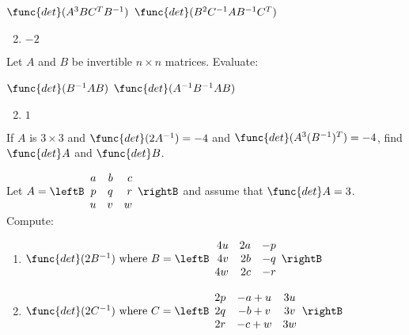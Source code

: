 \begin{multicols}{2}
\begin{ex}
\begin{exenumerate}
\exitem $\func{det}(A^{3}BC^{T}B^{-1})$
\exitem $\func{det}(B^{2}C^{-1}AB^{-1}C^{T})$
\end{exenumerate}
\begin{sol}
\begin{enumerate}[label={\alph*.}]
\setcounter{enumi}{1}
\item  $-2$

\end{enumerate}
\end{sol}
\end{ex}

\begin{ex}
Let $A$ and $B$ be invertible $n \times n$ matrices. Evaluate:

\begin{exenumerate}
\exitem $\func{det}(B^{-1}AB)$
\exitem $\func{det}(A^{-1}B^{-1}AB)$
\end{exenumerate}
\begin{sol}
\begin{enumerate}[label={\alph*.}]
\setcounter{enumi}{1}
\item  $1$

\end{enumerate}
\end{sol}
\end{ex}

\begin{ex}
If $A$ is $3 \times 3$ and $\func{det}(2A^{-1}) = -4$ and $\func{det}(A^{3}(B^{-1})^{T})=-4$, find $\func{det }A$ and $\func{det }B$.
\end{ex}

\begin{ex}
Let $A = \leftB \begin{array}{rrr}
a & b & c \\
p & q & r \\
u & v & w 
\end{array}\rightB$ 
 and assume that $\func{det } A = 3$. Compute:

\begin{enumerate}[label={\alph*.}]
\item $\func{det} (2B^{-1}) \mbox{ where } B = \leftB \begin{array}{rrr}
4u & 2a & -p \\
4v & 2b & -q \\
4w & 2c & -r 
\end{array}\rightB $

\item $\func{det} (2C^{-1}) \mbox{ where } C = \leftB \begin{array}{ccc}
2p & -a+u & 3u \\
2q & -b+v & 3v \\
2r & -c+w & 3w
\end{array}\rightB $


\end{enumerate}
\end{ex}
\end{multicols}
